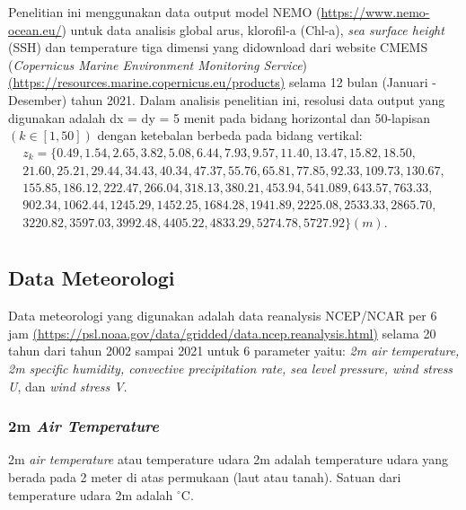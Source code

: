 \begin{spacing}{1.5}
	Penelitian ini menggunakan data output model NEMO (\href{https://www.nemo-ocean.eu/}{https://www.nemo-ocean.eu/}) untuk data analisis global arus, klorofil-a (Chl-a), \textit{sea surface height} (SSH) dan temperature tiga dimensi yang didownload dari website CMEMS (\textit{Copernicus Marine Environment Monitoring Service}) \href{https://resources.marine.copernicus.eu/products}{(https://resources.marine.copernicus.eu/products)} selama 12 bulan (Januari - Desember) tahun 2021.  Dalam analisis penelitian ini, resolusi data output yang digunakan adalah dx = dy = 5 menit pada bidang horizontal dan 50-lapisan $(k \in [1,50])$ dengan ketebalan berbeda pada bidang vertikal:
	\begin{equation*}
		\begin{aligned}
			z_k = \{0.49, 1.54, 2.65, 3.82, 5.08, 6.44, 7.93, 9.57, 11.40, 13.47, 15.82, 18.50, \\
			21.60, 25.21, 29.44, 34.43, 40.34, 47.37, 55.76, 65.81, 77.85, 92.33, 109.73, 130.67, \\
			155.85, 186.12, 222.47, 266.04, 318.13, 380.21, 453.94, 541.089, 643.57, 763.33, \\
			902.34, 1062.44, 1245.29, 1452.25, 1684.28, 1941.89, 2225.08, 2533.33, 2865.70,  \\
			3220.82, 3597.03, 3992.48, 4405.22, 4833.29, 5274.78, 5727.92 \} (m). \\
		\end{aligned}
	\end{equation*}

\subsection[Data Meteorologi]{Data Meteorologi}
	Data meteorologi yang digunakan adalah data reanalysis NCEP/NCAR per 6 jam \href{https://psl.noaa.gov/data/gridded/data.ncep.reanalysis.html}{(https://psl.noaa.gov/data/gridded/data.ncep.reanalysis.html)} selama 20 tahun dari tahun 2002 sampai 2021 untuk 6 parameter yaitu: \textit{2m air temperature, 2m specific humidity, convective precipitation rate, sea level pressure, wind stress U}, dan \textit{wind stress V}.
\subsubsection[2m \textit{Air Temperature}]{2m \textit{Air Temperature}}
	2m \textit{air temperature} atau temperature udara 2m adalah temperature udara yang berada pada 2 meter di atas permukaan (laut atau tanah). Satuan dari temperature udara 2m adalah $^\circ$C.

\end{spacing}
